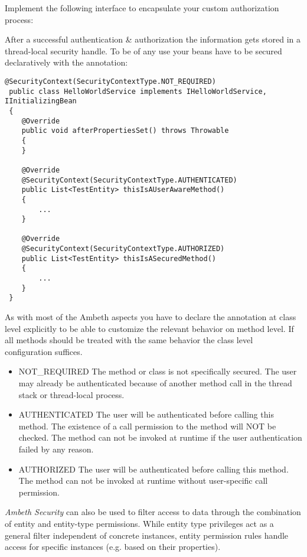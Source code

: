 Implement the following interface to encapsulate your custom authorization process:

After a successful authentication \& authorization the information gets stored in a thread-local security handle. To be of any use your beans have to be secured declaratively with the  annotation:

\begin{lstlisting}[style=Java]
@SecurityContext(SecurityContextType.NOT_REQUIRED)
 public class HelloWorldService implements IHelloWorldService, IInitializingBean
 {
 	@Override
 	public void afterPropertiesSet() throws Throwable
 	{
 	}
 
 	@Override
 	@SecurityContext(SecurityContextType.AUTHENTICATED)
 	public List<TestEntity> thisIsAUserAwareMethod()
 	{
 		...
 	}
 
 	@Override
 	@SecurityContext(SecurityContextType.AUTHORIZED)
 	public List<TestEntity> thisIsASecuredMethod()
 	{
 		...
 	}
 }
\end{lstlisting}
As with most of the Ambeth aspects you have to declare the annotation at class level explicitly to be able to customize the relevant behavior on method level. If all methods should be treated with the same behavior the class level configuration suffices.

\begin{itemize}
	\item NOT\_REQUIRED The method or class is not specifically secured. The user may already be authenticated because of another method call in the thread stack or thread-local process.
	\item AUTHENTICATED The user will be authenticated before calling this method. The existence of a call permission to the method will NOT be checked. The method can not be invoked at runtime if the user authentication failed by any reason.
	\item AUTHORIZED The user will be authenticated before calling this method. The method can not be invoked at runtime without user-specific call permission.
\end{itemize}


\textit{Ambeth Security} can also be used to filter access to data through the combination of entity and entity-type permissions. While entity type privileges act as a general filter independent of concrete instances, entity permission rules handle access for specific instances (e.g. based on their properties).